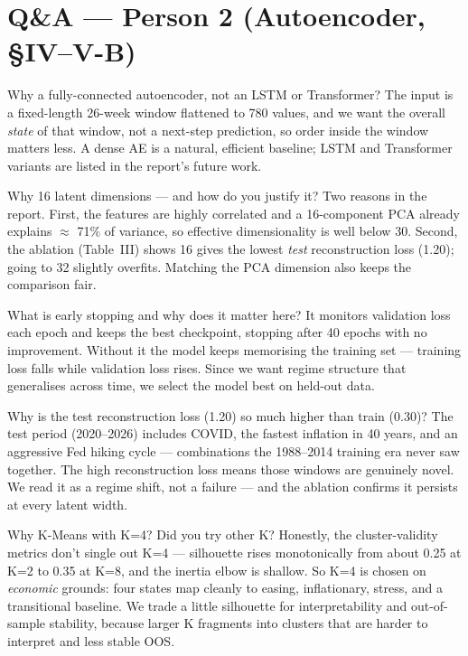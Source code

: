 \documentclass[11pt]{article}
\begin{document}
\section{Q\&A — Person 2 (Autoencoder, §IV–V-B)}

\begin{qa}{Why a fully-connected autoencoder, not an LSTM or Transformer?}
The input is a fixed-length 26-week window flattened to 780 values, and we want the
overall \emph{state} of that window, not a next-step prediction, so order inside the
window matters less. A dense AE is a natural, efficient baseline; LSTM and
Transformer variants are listed in the report's future work.
\end{qa}

\begin{qa}{Why 16 latent dimensions --- and how do you justify it?}
Two reasons in the report. First, the features are highly correlated and a
16-component PCA already explains $\approx$ 71\% of variance, so effective
dimensionality is well below 30. Second, the ablation (Table~III) shows 16 gives the
lowest \emph{test} reconstruction loss (1.20); going to 32 slightly overfits.
Matching the PCA dimension also keeps the comparison fair.
\end{qa}

\begin{qa}{What is early stopping and why does it matter here?}
It monitors validation loss each epoch and keeps the best checkpoint, stopping after
40 epochs with no improvement. Without it the model keeps memorising the training
set --- training loss falls while validation loss rises. Since we want regime
structure that generalises across time, we select the model best on held-out data.
\end{qa}

\begin{qa}{Why is the test reconstruction loss (1.20) so much higher than train (0.30)?}
The test period (2020–2026) includes COVID, the fastest inflation in 40 years, and
an aggressive Fed hiking cycle --- combinations the 1988–2014 training era never saw
together. The high reconstruction loss means those windows are genuinely novel. We
read it as a regime shift, not a failure --- and the ablation confirms it persists at
every latent width.
\end{qa}

\begin{qa}{Why K-Means with K=4? Did you try other K?}
Honestly, the cluster-validity metrics don't single out K=4 --- silhouette rises
monotonically from about 0.25 at K=2 to 0.35 at K=8, and the inertia elbow is
shallow. So K=4 is chosen on \emph{economic} grounds: four states map cleanly to
easing, inflationary, stress, and a transitional baseline. We trade a little
silhouette for interpretability and out-of-sample stability, because larger K
fragments into clusters that are harder to interpret and less stable OOS.
\end{qa}
\end{document}
